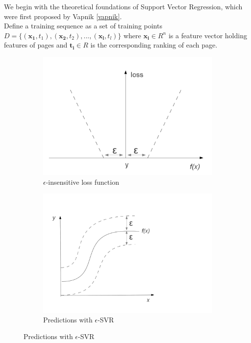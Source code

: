 \documentclass[12pt,notitlepage,twoside]{scrreprt}
\begin{document}
We begin with the theoretical foundations of Support Vector
Regression, which were first proposed by Vapnik \ref{vapnik}.\\ Define a
training sequence as a set of training points \(D = \{ (\mathbf{x_1},t_1),
(\mathbf{x_2},t_2), ... , (\mathbf{x_l},t_l) \}\) where \( \mathbf{x_i} \in R^n
\) is a feature vector holding features of pages and \( \mathbf{t_i} \in R \)
is the corresponding ranking of each page.

\begin{figure}[h!]
  \centering 
  \begin{subfigure}[b]{0.49\textwidth}
  \includegraphics[width=\linewidth]{figs/loss.png}
  \caption{\(\epsilon\)-insensitive loss function}
  \label{eps} 
\end{subfigure}
  \begin{subfigure}[b]{0.49\textwidth}
  \centering 
  \includegraphics[width=\linewidth]{figs/loss2.png}
  \caption{Predictions with \(\epsilon\)-SVR}
  \label{eps2} 
\end{subfigure}
\end{figure}
\end{document}

